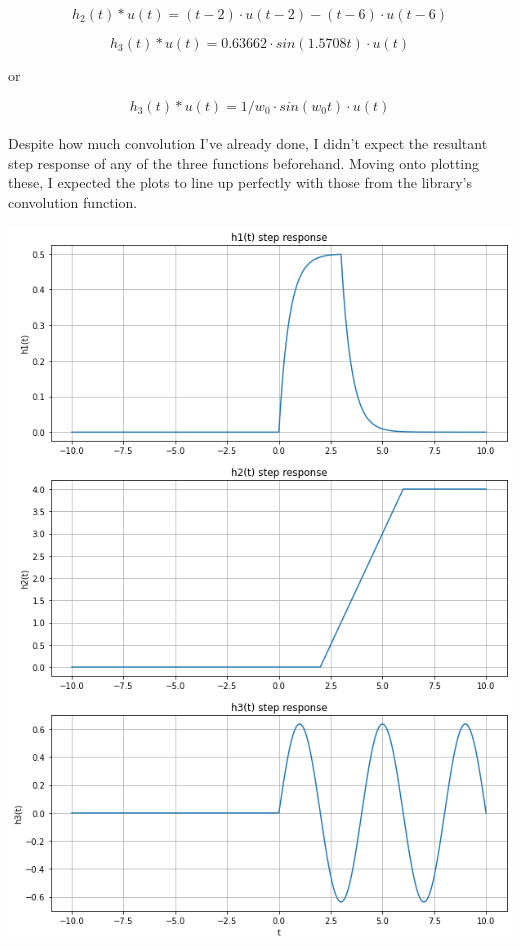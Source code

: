 \documentclass[12pt]{report}
\begin{document}
    \begin{equation*}
        h_2(t) * u(t) = (t-2) \cdot u(t-2) - (t-6) \cdot u(t-6)
    \end{equation*}
    
    \begin{equation*}
        h_3(t) * u(t) = 0.63662 \cdot sin(1.5708t) \cdot u(t)
    \end{equation*}
    
    \begin{center} or \end{center}
    \begin{equation*}
        h_3(t) * u(t) = 1/w_0 \cdot sin(w_0t) \cdot u(t)
    \end{equation*}
    
    \paragraph{} Despite how much convolution I've already done, I didn't expect the resultant step response of any of the three functions beforehand. Moving onto plotting these, I expected the plots to line up perfectly with those from the library's convolution function.  
    
    \includegraphics[scale=0.6]{h1-3 hand response.png}
    
\end{document}

